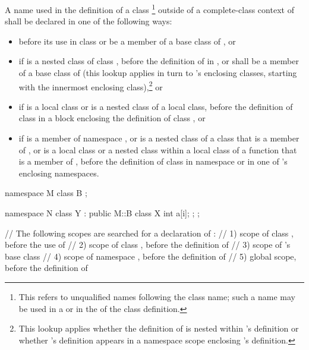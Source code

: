 \pnum
A name used in the definition of a class %
\footnote{This
refers to unqualified names following the class name;
such a name may be used in a  or
in the  of the class definition.}
outside of a complete-class context of 
shall be declared in one of the following ways:
\begin{itemize}
\item before its use in class  or be a member of a base class
of , or
\item if  is a nested class of class
, before the definition of  in
, or shall be a member of a base class of  (this
lookup applies in turn to 's enclosing classes, starting with
the innermost enclosing class),\footnote{This lookup applies whether the
definition of  is
nested within 's definition or whether 's definition
appears in a namespace scope enclosing 's
definition.}
or
\item if  is a local class or is a nested
class of a local class, before the definition of class  in a
block enclosing the definition of class , or
\item if  is a member of namespace , or is a nested
class of a class that is a member of , or is a local class or a
nested class within a local class of a function that is a member of
, before the definition of class  in namespace
 or in one of 's enclosing namespaces.
\end{itemize}
\begin{example}
\begin{codeblock}
namespace M {
  class B { };
}

\end{codeblock}
\begin{codeblock}
namespace N {
  class Y : public M::B {
    class X {
      int a[i];
    };
  };
}

// The following scopes are searched for a declaration of :
// 1) scope of class , before the use of 
// 2) scope of class , before the definition of 
// 3) scope of 's base class 
// 4) scope of namespace , before the definition of 
// 5) global scope, before the definition of 
\end{codeblock}
\end{example}

